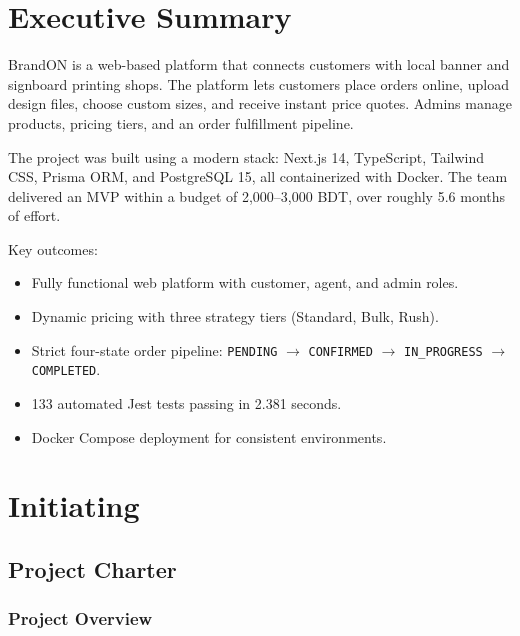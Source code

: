 \documentclass[12pt,a4paper]{report}
\begin{document}
\chapter*{Executive Summary}

BrandON is a web-based platform that connects customers with local banner and signboard printing shops. The platform lets customers place orders online, upload design files, choose custom sizes, and receive instant price quotes. Admins manage products, pricing tiers, and an order fulfillment pipeline.

The project was built using a modern stack: Next.js 14, TypeScript, Tailwind CSS, Prisma ORM, and PostgreSQL 15, all containerized with Docker. The team delivered an MVP within a budget of 2,000--3,000 BDT, over roughly 5.6 months of effort.

Key outcomes:
\begin{itemize}
  \item Fully functional web platform with customer, agent, and admin roles.
  \item Dynamic pricing with three strategy tiers (Standard, Bulk, Rush).
  \item Strict four-state order pipeline: \texttt{PENDING} $\to$ \texttt{CONFIRMED} $\to$ \texttt{IN\_PROGRESS} $\to$ \texttt{COMPLETED}.
  \item 133 automated Jest tests passing in 2.381 seconds.
  \item Docker Compose deployment for consistent environments.
\end{itemize}

\chapter{Initiating}

\section{Project Charter}

\subsection{Project Overview}
\end{document}
